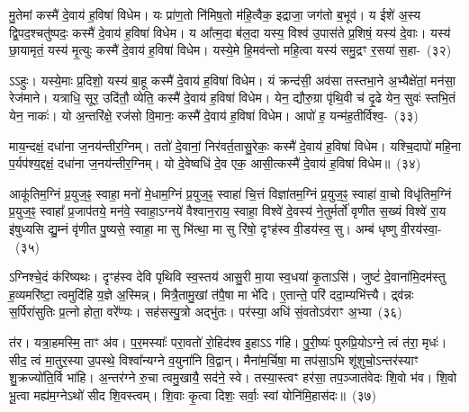 मु॒तेमां कस्मै॑ दे॒वाय॑ ह॒विषा॑ विधेम। यः प्रा॑ण॒तो नि॑मिष॒तो म॑हि॒त्वैक॒ इद्राजा॒ जग॑तो ब॒भूव॑। य ईशे॑ अ॒स्य द्वि॒पद॒श्चतु॑ष्पदः॒ कस्मै॑ दे॒वाय॑ ह॒विषा॑ विधेम। य आ᳚त्म॒दा ब॑ल॒दा यस्य॒ विश्व॑ उ॒पास॑ते प्र॒शिषं॒ यस्य॑ दे॒वाः। यस्य॑ छा॒यामृतं॒ यस्य॑ मृ॒त्युः कस्मै॑ दे॒वाय॑ ह॒विषा॑ विधेम। यस्ये॒मे हि॒मव॑न्तो महि॒त्वा यस्य॑ समु॒द्रꣳ र॒सया॑ स॒हा-~(३२)

ऽऽहुः। यस्ये॒माः प्र॒दिशो॒ यस्य॑ बा॒हू कस्मै॑ दे॒वाय॑ ह॒विषा॑ विधेम। यं क्रन्द॑सी॒ अव॑सा तस्तभा॒ने अ॒भ्यैक्षे॑तां॒ मन॑सा॒ रेज॑माने। यत्राधि॒ सूर॒ उदि॑तौ॒ व्येति॒ कस्मै॑ दे॒वाय॑ ह॒विषा॑ विधेम। येन॒ द्यौरु॒ग्रा पृ॑थि॒वी च॑ दृ॒ढे येन॒ सुवः॑ स्तभि॒तं येन॒ नाकः॑। यो अ॒न्तरि॑क्षे॒ रज॑सो वि॒मानः॒ कस्मै॑ दे॒वाय॑ ह॒विषा॑ विधेम। आपो॑ ह॒ यन्म॑ह॒तीर्विश्व॒-~(३३)

माय॒न्दक्षं॒ दधा॑ना ज॒नय॑न्तीर॒ग्निम्। ततो॑ दे॒वानां॒ निर॑वर्त॒तासु॒रेकः॒ कस्मै॑ दे॒वाय॑ ह॒विषा॑ विधेम। यश्चि॒दापो॑ महि॒ना प॒र्यप॑श्य॒द्दक्षं॒ दधा॑ना ज॒नय॑न्तीर॒ग्निम्। यो दे॒वेष्वधि॑ दे॒व एक॒ आसी॒त्कस्मै॑ दे॒वाय॑ ह॒विषा॑ विधेम॥~(३४)

{\anuvakamend[{अ॒ग्नेः स सर॑स्वती॒ द्याꣳ स॒ह विश्व॒ञ्चतु॑स्त्रिꣳशश्च}]}%

आकू॑तिम॒ग्निं प्र॒युज॒ꣴ॒ स्वाहा॒ मनो॑ मे॒धाम॒ग्निं प्र॒युज॒ꣴ॒ स्वाहा॑ चि॒त्तं विज्ञा॑तम॒ग्निं प्र॒युज॒ꣴ॒ स्वाहा॑ वा॒चो विधृ॑तिम॒ग्निं प्र॒युज॒ꣴ॒ स्वाहा᳚ प्र॒जा\-प॑तये॒ मन॑वे॒ स्वाहा॒ऽग्नये॑ वैश्वान॒राय॒ स्वाहा॒ विश्वे॑ दे॒वस्य॑ ने॒तुर्मर्तो॑ वृणीत स॒ख्यं विश्वे॑ रा॒य इ॑षुध्यसि द्यु॒म्नं वृ॑णीत पु॒ष्यसे॒ स्वाहा॒ मा सु भि॑त्था॒ मा सु रि॑षो॒ दृꣳह॑स्व वी॒डय॑स्व॒ सु। अम्ब॑ धृष्णु वी॒रय॑स्वा॒-~(३५)

ऽग्निश्चे॒दं क॑रिष्यथः। दृꣳह॑स्व देवि पृथिवि स्व॒स्तय॑ आसु॒री मा॒या स्व॒धया॑ कृ॒ताऽसि॑। जुष्टं॑ दे॒वाना॑मि॒दम॑स्तु ह॒व्यमरि॑ष्टा॒ त्वमुदि॑हि य॒ज्ञे अ॒स्मिन्न्। मित्रै॒तामु॒खां त॑पै॒षा मा भे॑दि। ए॒तान्ते॒ परि॑ ददा॒म्यभि॑त्त्यै। द्र्व॑न्नः स॒र्पिरा॑सुतिः प्र॒त्नो होता॒ वरे᳚ण्यः। सह॑सस्पु॒त्रो अद्भु॑तः। पर॑स्या॒ अधि॑ सं॒वतो\-ऽव॑राꣳ अ॒भ्या~(३६)

त॑र। यत्रा॒हमस्मि॒ ताꣳ अ॑व। प॒र॒मस्याः᳚ परा॒वतो॑ रो॒हिद॑श्व इ॒हाऽऽ ग॑हि। पु॒री॒ष्यः॑ पुरुप्रि॒यो\-ऽग्ने॒ त्वं त॑रा॒ मृधः॑। सीद॒ त्वं मा॒तुर॒स्या उ॒पस्थे॒ विश्वा᳚न्यग्ने व॒युना॑नि वि॒द्वान्। मैना॑म॒र्चिषा॒ मा तप॑सा॒ऽभि शू॑शुचो॒\-ऽन्तर॑स्याꣳ शु॒क्रज्यो॑ति॒र्वि भा॑हि। अ॒न्तर॑ग्ने रु॒चा त्वमु॒खायै॒ सद॑ने॒ स्वे। तस्या॒स्त्वꣳ हर॑सा॒ तप॒ञ्जात॑वेदः शि॒वो भ॑व। शि॒वो भू॒त्वा मह्य॑म॒ग्ने\-ऽथो॑ सीद शि॒वस्त्वम्। शि॒वाः कृ॒त्वा दिशः॒ सर्वाः॒ स्वां योनि॑मि॒हास॑दः॥~(३७)

{\anuvakamend[{वी॒रय॒स्वा तप॑न्विꣳश॒तिश्च॑}]}%

